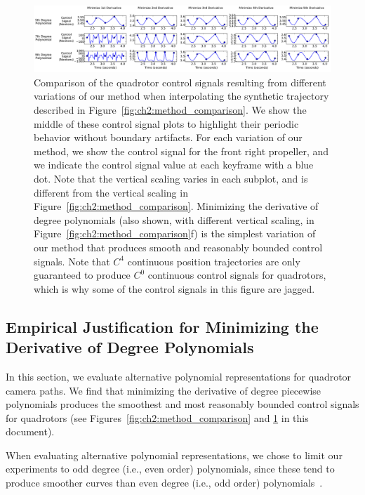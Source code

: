 \begin{figure}[t!]
\centering
\includegraphics[width=6.0in]{images/2015_siggraph_asia_supplementary/parameter_comparison}
\caption{
Comparison of the quadrotor control signals resulting from different variations of our method when interpolating the synthetic trajectory described in Figure~\ref{fig:ch2:method_comparison}.
We show the middle of these control signal plots to highlight their periodic behavior without boundary artifacts.
For each variation of our method, we show the control signal for the front right propeller, and we indicate the control signal value at each keyframe with a blue dot. Note that the vertical scaling varies in each subplot, and is different from the vertical scaling in Figure~\ref{fig:ch2:method_comparison}.
Minimizing the  derivative of  degree polynomials (also shown, with different vertical scaling, in Figure~\ref{fig:ch2:method_comparison}f) is the simplest variation of our method that produces smooth and reasonably bounded control signals.
Note that  $C^4$ continuous position trajectories are only guaranteed to produce $C^0$ continuous control signals for quadrotors, which is why some of the control signals in this figure are jagged.
}
\label{fig:ch2:parameter_comparison}
\end{figure}

\subsection{Empirical Justification for Minimizing the  Derivative of  Degree Polynomials}
\label{sec:ch2:derivative_experiment}

In this section, we evaluate alternative polynomial representations for quadrotor camera paths.
We find that minimizing the  derivative of  degree piecewise polynomials produces the smoothest and most reasonably bounded control signals for quadrotors (see Figures~\ref{fig:ch2:method_comparison} and \ref{fig:ch2:parameter_comparison} in this document).

When evaluating alternative polynomial representations, we chose to limit our experiments to odd degree (i.e., even order) polynomials, since these tend to produce smoother curves than even degree (i.e., odd order) polynomials~\cite{goshtasby:1990}.


